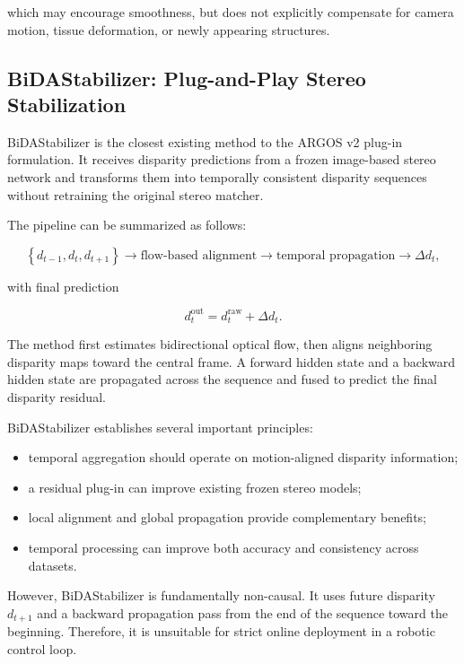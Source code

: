 \documentclass[11pt,a4paper]{article}
\begin{document}
which may encourage smoothness, but does not explicitly compensate for camera motion, tissue deformation, or newly appearing structures.

\subsection{BiDAStabilizer: Plug-and-Play Stereo Stabilization}

BiDAStabilizer is the closest existing method to the ARGOS v2 plug-in formulation. It receives disparity predictions from a frozen image-based stereo network and transforms them into temporally consistent disparity sequences without retraining the original stereo matcher.

The pipeline can be summarized as follows:

\begin{equation}
\left\{
d_{t-1},
d_t,
d_{t+1}
\right\}
\rightarrow
\text{flow-based alignment}
\rightarrow
\text{temporal propagation}
\rightarrow
\Delta d_t,
\end{equation}

with final prediction

\begin{equation}
d_t^{\mathrm{out}}
=
d_t^{\mathrm{raw}}
+
\Delta d_t.
\end{equation}

The method first estimates bidirectional optical flow, then aligns neighboring disparity maps toward the central frame. A forward hidden state and a backward hidden state are propagated across the sequence and fused to predict the final disparity residual.

BiDAStabilizer establishes several important principles:

\begin{itemize}
    \item temporal aggregation should operate on motion-aligned disparity information;
    \item a residual plug-in can improve existing frozen stereo models;
    \item local alignment and global propagation provide complementary benefits;
    \item temporal processing can improve both accuracy and consistency across datasets.
\end{itemize}

However, BiDAStabilizer is fundamentally non-causal. It uses future disparity $d_{t+1}$ and a backward propagation pass from the end of the sequence toward the beginning. Therefore, it is unsuitable for strict online deployment in a robotic control loop.
\end{document}
